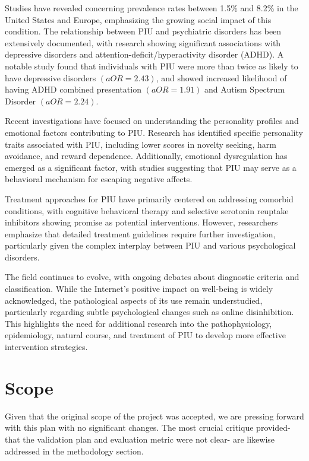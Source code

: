\documentclass[11pt]{extarticle}
\begin{document}
    Studies have revealed concerning prevalence rates between 1.5\% and 8.2\% in the United States and Europe, emphasizing the growing social impact of this condition. 
    The relationship between PIU and psychiatric disorders has been extensively documented, with research showing significant associations with depressive disorders and attention-deficit/hyperactivity disorder (ADHD). 
    A notable study found that individuals with PIU were more than twice as likely to have depressive disorders $(aOR = 2.43)$, and showed increased likelihood of having ADHD combined presentation $(aOR = 1.91)$ and Autism Spectrum Disorder $(aOR = 2.24)$.
    
    Recent investigations have focused on understanding the personality profiles and emotional factors contributing to PIU. Research has identified specific personality traits associated with PIU, including lower scores in novelty seeking, harm avoidance, and reward dependence. 
    Additionally, emotional dysregulation has emerged as a significant factor, with studies suggesting that PIU may serve as a behavioral mechanism for escaping negative affects.
    
    Treatment approaches for PIU have primarily centered on addressing comorbid conditions, with cognitive behavioral therapy and selective serotonin reuptake inhibitors showing promise as potential interventions.
    However, researchers emphasize that detailed treatment guidelines require further investigation, particularly given the complex interplay between PIU and various psychological disorders.
    
    The field continues to evolve, with ongoing debates about diagnostic criteria and classification. While the Internet's positive impact on well-being is widely acknowledged, the pathological aspects of its use remain understudied, particularly regarding subtle psychological changes such as online disinhibition. 
    This highlights the need for additional research into the pathophysiology, epidemiology, natural course, and treatment of PIU to develop more effective intervention strategies.

\section{Scope}

    Given that the original scope of the project was accepted, we are pressing forward with this plan with no significant changes.
    The most crucial critique provided- that the validation plan and evaluation metric were not clear- are likewise addressed in the methodology section.
\end{document}
